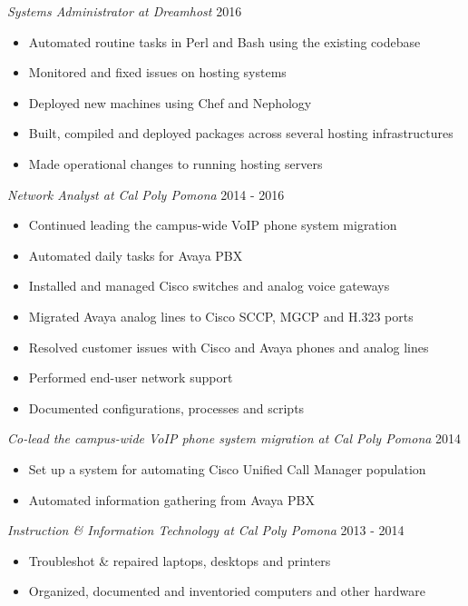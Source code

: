 \documentclass[line]{tex/res}
\begin{document}
\begin{resume}
	{\sl Systems Administrator at Dreamhost} \hfill 2016
	\begin{itemize} \itemsep -2pt
		\item Automated routine tasks in Perl and Bash using the existing codebase
		\item Monitored and fixed issues on hosting systems
		\item Deployed new machines using Chef and Nephology
		\item Built, compiled and deployed packages across several hosting infrastructures
		\item Made operational changes to running hosting servers
	\end{itemize}

	{\sl Network Analyst at Cal Poly Pomona} \hfill 2014 - 2016
	\begin{itemize} \itemsep -2pt
		\item Continued leading the campus-wide VoIP phone system migration
		\item Automated daily tasks for Avaya PBX
		\item Installed and managed Cisco switches and analog voice gateways
		\item Migrated Avaya analog lines to Cisco SCCP, MGCP and H.323 ports
		\item Resolved customer issues with Cisco and Avaya phones and analog lines
		\item Performed end-user network support
		\item Documented configurations, processes and scripts
	\end{itemize}

	{\sl Co-lead the campus-wide VoIP phone system migration at Cal Poly Pomona} \hfill 2014
	\begin{itemize} \itemsep -2pt
		\item Set up a system for automating Cisco Unified Call Manager population
		\item Automated information gathering from Avaya PBX
	\end{itemize}

	{\sl Instruction \& Information Technology at Cal Poly Pomona} \hfill 2013 - 2014
	\begin{itemize} \itemsep -2pt
		\item Troubleshot \& repaired laptops, desktops and printers
		\item Organized, documented and inventoried computers and other hardware
	\end{itemize}


\end{resume}
\end{document}

